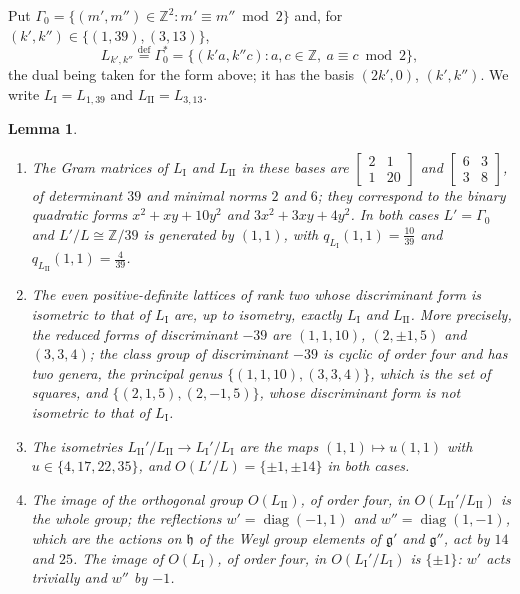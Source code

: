 \documentclass[leqno]{article}
\newcommand{\Z}{\ensuremath{\mathbb{Z}}}
\newcommand{\ov}{\overset}
\newtheorem{lemma}[thm]{Lemma}
\numberwithin{equation}{section}
\begin{document}
Put $\Gamma_0 = \{(m',m'') \in \Z^2 : m' \equiv m'' \bmod 2\}$ and, for $(k',k'') \in \{(1,39),(3,13)\}$,
\[
L_{k',k''} \ov{\mathrm{def}}{=} \Gamma_0^* = \{(k'a,k''c) : a, c \in \Z,\ a \equiv c \bmod 2\},
\]
the dual being taken for the form above; it has the basis $(2k',0)$, $(k',k'')$. We write $L_{\mathrm I} = L_{1,39}$ and $L_{\mathrm{II}} = L_{3,13}$.

\begin{lemma}
\label{lem:two-lattices}
\begin{enumerate}
\item The Gram matrices of $L_{\mathrm I}$ and $L_{\mathrm{II}}$ in these bases are $\left[\begin{smallmatrix}2&1\\1&20\end{smallmatrix}\right]$ and $\left[\begin{smallmatrix}6&3\\3&8\end{smallmatrix}\right]$, of determinant $39$ and minimal norms $2$ and $6$; they correspond to the binary quadratic forms $x^2+xy+10y^2$ and $3x^2+3xy+4y^2$. In both cases $L' = \Gamma_0$ and $L'/L \cong \Z/39$ is generated by $(1,1)$, with $q_{L_{\mathrm I}}(1,1) = \frac{10}{39}$ and $q_{L_{\mathrm{II}}}(1,1) = \frac4{39}$.
\item The even positive-definite lattices of rank two whose discriminant form is isometric to that of $L_{\mathrm I}$ are, up to isometry, exactly $L_{\mathrm I}$ and $L_{\mathrm{II}}$. More precisely, the reduced forms of discriminant $-39$ are $(1,1,10)$, $(2,\pm1,5)$ and $(3,3,4)$; the class group of discriminant $-39$ is cyclic of order four and has two genera, the principal genus $\{(1,1,10),(3,3,4)\}$, which is the set of squares, and $\{(2,1,5),(2,-1,5)\}$, whose discriminant form is not isometric to that of $L_{\mathrm I}$.
\item The isometries $L_{\mathrm{II}}'/L_{\mathrm{II}} \to L_{\mathrm I}'/L_{\mathrm I}$ are the maps $(1,1) \mapsto u(1,1)$ with $u \in \{4,17,22,35\}$, and $O(L'/L) = \{\pm1,\pm14\}$ in both cases.
\item The image of the orthogonal group $O(L_{\mathrm{II}})$, of order four, in $O(L_{\mathrm{II}}'/L_{\mathrm{II}})$ is the whole group; the reflections $w' = \operatorname{diag}(-1,1)$ and $w'' = \operatorname{diag}(1,-1)$, which are the actions on $\mathfrak h$ of the Weyl group elements of $\mathfrak g'$ and $\mathfrak g''$, act by $14$ and $25$. The image of $O(L_{\mathrm I})$, of order four, in $O(L_{\mathrm I}'/L_{\mathrm I})$ is $\{\pm1\}$: $w'$ acts trivially and $w''$ by $-1$.
\end{enumerate}
\end{lemma}
\end{document}
